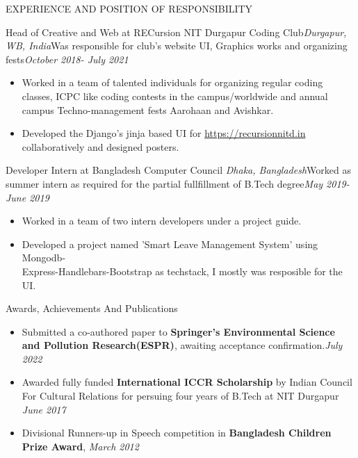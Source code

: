 \documentclass{resume} %
\begin{document}
\begin{rSection}{EXPERIENCE AND POSITION OF RESPONSIBILITY}

\begin{rSubsection}{Head of Creative and Web at RECursion NIT Durgapur Coding Club}{\sl Durgapur, WB, India}{Was responsible for club's website UI, Graphics works and organizing fests}{\sl October 2018- July 2021}
\begin{itemize}[noitemsep,label=\small\textbullet]
\item Worked in a team of talented individuals for organizing regular coding \\classes, ICPC like coding contests in the campus/worldwide and annual \\campus Techno-management fests Aarohaan and Avishkar.
\item Developed the Django's jinja based UI for \href {https://recursionnitd.in}{https://recursionnitd.in} collaboratively and designed posters.
\end{itemize}
\end{rSubsection}  


\begin{rSubsection}{Developer Intern at Bangladesh Computer Council} {\sl Dhaka, Bangladesh}{Worked as summer intern as required for the partial fullfillment of B.Tech degree}{\sl May 2019-June 2019} 
\begin{itemize}[noitemsep,label=\small\textbullet]
\item Worked in a team of two intern developers under a project guide.     
\item Developed a project named 'Smart Leave Management System' using Mongodb-\\Express-Handlebars-Bootstrap as techstack, I mostly was resposible for the UI.
\end{itemize}
\end{rSubsection}

\end{rSection}
  


\begin{rSection}{Awards, Achievements And Publications}   
\begin{itemize}[noitemsep,label=\small\textbullet]
\item Submitted a co-authored paper to \textbf{Springer's Environmental Science and Pollution Research(ESPR)}, awaiting acceptance confirmation.\hfill {\sl July 2022} 
\item Awarded fully funded \textbf{International ICCR Scholarship} by Indian Council \\For Cultural Relations for persuing four years of B.Tech at NIT Durgapur \hfill {\sl June 2017} 
\item Divisional Runners-up in Speech competition in \textbf{Bangladesh Children Prize Award}, \hfill {\sl March 2012} 
\end{itemize}  
\end{rSection} 
\end{document}
